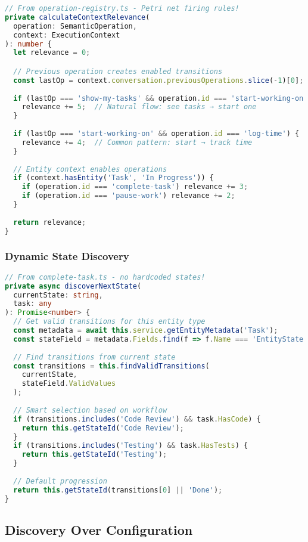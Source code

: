 \documentclass[11pt,a4paper]{article}
\begin{document}
\begin{lstlisting}[language=TypeScript]
// From operation-registry.ts - Petri net firing rules!
private calculateContextRelevance(
  operation: SemanticOperation, 
  context: ExecutionContext
): number {
  let relevance = 0;

  // Previous operation creates enabled transitions
  const lastOp = context.conversation.previousOperations.slice(-1)[0];
  
  if (lastOp === 'show-my-tasks' && operation.id === 'start-working-on') {
    relevance += 5;  // Natural flow: see tasks → start one
  }
  
  if (lastOp === 'start-working-on' && operation.id === 'log-time') {
    relevance += 4;  // Common pattern: start → track time
  }
  
  // Entity context enables operations
  if (context.hasEntity('Task', 'In Progress')) {
    if (operation.id === 'complete-task') relevance += 3;
    if (operation.id === 'pause-work') relevance += 2;
  }
  
  return relevance;
}
\end{lstlisting}

\subsubsection{Dynamic State Discovery}

\begin{lstlisting}[language=TypeScript]
// From complete-task.ts - no hardcoded states!
private async discoverNextState(
  currentState: string,
  task: any
): Promise<number> {
  // Get valid transitions for this entity type
  const metadata = await this.service.getEntityMetadata('Task');
  const stateField = metadata.Fields.find(f => f.Name === 'EntityState');
  
  // Find transitions from current state
  const transitions = this.findValidTransitions(
    currentState, 
    stateField.ValidValues
  );
  
  // Smart selection based on workflow
  if (transitions.includes('Code Review') && task.HasCode) {
    return this.getStateId('Code Review');
  }
  if (transitions.includes('Testing') && task.HasTests) {
    return this.getStateId('Testing');
  }
  
  // Default progression
  return this.getStateId(transitions[0] || 'Done');
}
\end{lstlisting}

\subsection{Discovery Over Configuration}
\end{document}
